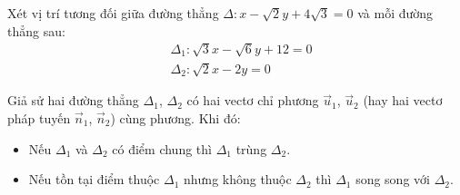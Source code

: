\begin{vd}
	Xét vị trí tương đối giữa đường thẳng $\Delta\colon x-\sqrt{2} y+4\sqrt{3}=0$ và mỗi đường thẳng sau:
	$$
	\begin{aligned}
		&\Delta_1\colon \sqrt{3}x-\sqrt{6}y+12=0 \\
		&\Delta_2\colon \sqrt{2}x-2y=0
	\end{aligned}$$
\end{vd}
\begin{nx}
	Giả sử hai đường thẳng $\Delta_1$, $\Delta_2$ có hai vectơ chỉ phương $\overrightarrow{u}_1$, $\overrightarrow{u}_2$ (hay hai vectơ pháp tuyến $\overrightarrow{n}_1$, $\overrightarrow{n}_2$) cùng phương. Khi đó:
	\begin{itemize}
		\item Nếu $\Delta_1$ và $\Delta_2$ có điểm chung thì $\Delta_1$ trùng $\Delta_2$.
		\item Nếu tồn tại điểm thuộc $\Delta_1$ nhưng không thuộc $\Delta_2$ thì $\Delta_1$ song song với $\Delta_2$.
	\end{itemize}
\end{nx}

